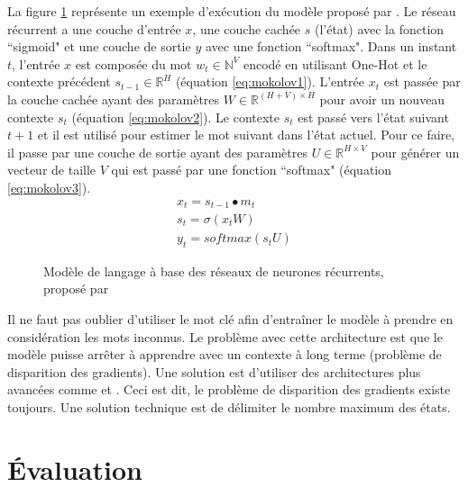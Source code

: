 \documentclass{KodeBook}
\begin{document}
La figure \ref{fig:mokolov} représente un exemple d'exécution du modèle proposé par \cite{2010-mokolov-al}.
Le réseau récurrent a une couche d'entrée $x$, une couche cachée $s$ (l'état) avec la fonction ``sigmoid" et une couche de sortie $y$ avec une fonction ``softmax".
Dans un instant $t$, l'entrée $x$ est composée du mot $w_t \in \mathbb{N}^{V}$ encodé en utilisant One-Hot et le contexte précédent $s_{t-1} \in \mathbb{R}^{H}$ (équation \ref{eq:mokolov1}). 
L'entrée $x_t$ est passée par la couche cachée ayant des paramètres $W \in \mathbb{R}^{(H+V)\times H}$ pour avoir un nouveau contexte $s_t$ (équation \ref{eq:mokolov2}). 
Le contexte $s_t$ est passé vers l'état suivant $t+1$ et il est utilisé pour estimer le mot suivant dans l'état actuel.
Pour ce faire, il passe par une couche de sortie ayant des paramètres $U \in \mathbb{R}^{H\times V}$ pour générer un vecteur de taille $V$ qui est passé par une fonction ``softmax" (équation \ref{eq:mokolov3}).
%
\begin{align}
	x_t = s_{t-1} \bullet m_t \label{eq:mokolov1}\\
	s_t = \sigma(x_t W) \label{eq:mokolov2}\\
	y_t = softmax(s_t U) \label{eq:mokolov3}
\end{align}

\begin{figure}[ht]
	\centering
	\caption{Modèle de langage à base des réseaux de neurones récurrents, proposé par \cite{2010-mokolov-al}\label{fig:mokolov}}
\end{figure}

Il ne faut pas oublier d'utiliser le mot clé  afin d'entraîner le modèle à prendre en considération les mots inconnus. 
Le problème avec cette architecture est que le modèle puisse arrêter à apprendre avec un contexte à long terme (problème de disparition des gradients).
Une solution est d'utiliser des architectures plus avancées comme  et . 
Ceci est dit, le problème de disparition des gradients existe toujours. 
Une solution technique est de délimiter le nombre maximum des états.

\section{Évaluation}
\end{document}
